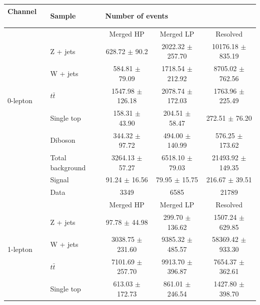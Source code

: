 \begin{table}[htbp]
\begin{center}
\begin{tabular}{| l | l | c | c | c |} \hline
Channel          　& Sample        & \multicolumn{3}{|l|}{Number of events} \\ \hline \hline
\multirow{7}{*}{0-lepton} &               & Merged HP  & Merged LP  & Resolved  \\ \cline{2-5}
                   & Z + jets     & 628.72 $\pm$ 90.2           & 2022.32 $\pm$ 257.70           & 10176.18 $\pm$ 835.19\\ 
                   & W + jets     & 584.81 $\pm$ 79.09           & 1718.54 $\pm$ 212.92           & 8705.02 $\pm$ 762.56\\  
                   & $t\bar{t}$   & 1547.98 $\pm$ 126.18           &  2078.74 $\pm$ 172.03          & 1763.96 $\pm$ 225.49\\ 
                   & Single top         & 158.31 $\pm$ 43.90           &   204.51 $\pm$ 58.47         & 272.51 $\pm$ 76.20  \\ 
                   & Diboson      &  344.32 $\pm$ 97.72           &  494.00 $\pm$ 140.99          & 576.25 $\pm$ 173.62\\ \cline{2-5}
                   & Total background    & 3264.13 $\pm$ 57.27           &  6518.10 $\pm$ 79.03          &21493.92 $\pm$ 149.35\\ \cline{2-5}
                   & Signal       & 91.24 $\pm$ 16.56           &   79.95 $\pm$ 15.75         & 216.67 $\pm$ 39.51\\ \cline{2-5}
                   & Data         & 3349           & 6585           &21789\\ \hline \hline
\multirow{7}{*}{1-lepton} &               & Merged HP  & Merged LP  & Resolved  \\ \cline{2-5}
                   & Z + jets     & 97.78 $\pm$ 44.98           & 299.70 $\pm$ 136.62           &1507.24 $\pm$ 629.85\\ 
                   & W + jets     & 3038.75 $\pm$ 231.60           &  9385.32 $\pm$ 485.57          &58369.42 $\pm$ 933.30\\  
                   & $t\bar{t}$   & 7101.69 $\pm$ 257.70           &  9913.70 $\pm$ 396.87          &7654.37 $\pm$ 362.61\\ 
                   & Single top         & 613.03 $\pm$ 172.73           &  861.01 $\pm$ 246.54          & 1427.80 $\pm$ 398.70\\ 

\end{tabular}
\end{center}
\end{table}
